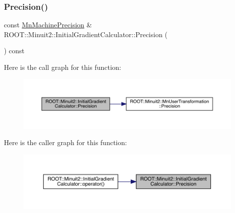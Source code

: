 \subsubsection{\texorpdfstring{Precision()}{Precision()}\hspace{0.1cm}{\footnotesize\ttfamily [3/3]}}
{\footnotesize\ttfamily const \mbox{\hyperlink{classROOT_1_1Minuit2_1_1MnMachinePrecision}{Mn\+Machine\+Precision}} \& R\+O\+O\+T\+::\+Minuit2\+::\+Initial\+Gradient\+Calculator\+::\+Precision (\begin{DoxyParamCaption}{ }\end{DoxyParamCaption}) const}

Here is the call graph for this function\+:
\nopagebreak
\begin{figure}[H]
\begin{center}
\leavevmode
\includegraphics[width=350pt]{d3/dcf/classROOT_1_1Minuit2_1_1InitialGradientCalculator_a7b85d42dfbb0581c4cb5f8ad47a798a0_cgraph}
\end{center}
\end{figure}
Here is the caller graph for this function\+:
\nopagebreak
\begin{figure}[H]
\begin{center}
\leavevmode
\includegraphics[width=350pt]{d3/dcf/classROOT_1_1Minuit2_1_1InitialGradientCalculator_a7b85d42dfbb0581c4cb5f8ad47a798a0_icgraph}
\end{center}
\end{figure}
\mbox{\label{classROOT_1_1Minuit2_1_1InitialGradientCalculator_afc3c2d01aedfca1ca5ba35d231f9916d}} 
